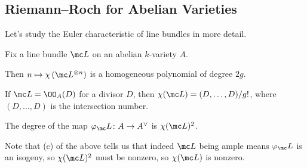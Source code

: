 \documentclass[../notes.tex]{subfiles}
\begin{document}
\subsection{Riemann--Roch for Abelian Varieties}
Let's study the Euler characteristic of line bundles in more detail.
\begin{proposition} \label{prop:riemann-roch-av}
	Fix a line bundle $\mc L$ on an abelian $k$-variety $A$.
	\begin{listalph}
		\item Then $n\mapsto\chi\left(\mc L^{\otimes n}\right)$ is a homogeneous polynomial of degree $2g$.
		\item If $\mc L=\OO_A(D)$ for a divisor $D$, then $\chi(\mc L)=(D,\ldots,D)/g!$, where $(D,\ldots,D)$ is the intersection number.
		\item The degree of the map $\varphi_\mc L\colon A\to A^\lor$ is $\chi(\mc L)^2$.
	\end{listalph}
\end{proposition}
\begin{remark} \label{rem:euler-char-of-ample-nonzero}
	Note that (c) of the above tells us that indeed $\mc L$ being ample means $\varphi_\mc L$ is an isogeny, so $\chi(\mc L)^2$ must be nonzero, so $\chi(\mc L)$ is nonzero.
\end{remark}
\end{document}
